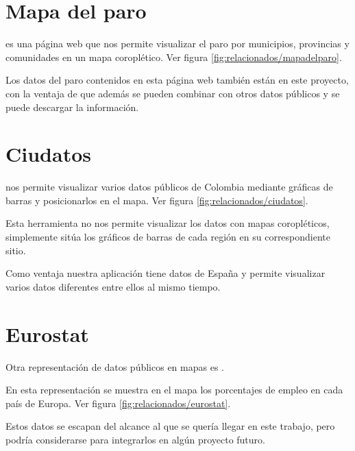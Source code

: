 

\section{Mapa del paro}

 es una página web que nos permite visualizar el paro por municipios, provincias y comunidades en un mapa coroplético. Ver figura \ref{fig:relacionados/mapadelparo}.

Los datos del paro contenidos en esta página web también están en este proyecto, con la ventaja de que además se pueden combinar con otros datos públicos y se puede descargar la información.


\section{Ciudatos}

 nos permite visualizar varios datos públicos de Colombia mediante gráficas de barras y posicionarlos en el mapa. Ver figura \ref{fig:relacionados/ciudatos}.

Esta herramienta no nos permite visualizar los datos con mapas coropléticos, simplemente sitúa los gráficos de barras de cada región en su correspondiente sitio.

Como ventaja nuestra aplicación tiene datos de España y permite visualizar varios datos diferentes entre ellos al mismo tiempo.


\section{Eurostat}

Otra representación de datos públicos en mapas es .

En esta representación se muestra en el mapa los porcentajes de empleo en cada país de Europa. Ver figura \ref{fig:relacionados/eurostat}.

Estos datos se escapan del alcance al que se quería llegar en este trabajo, pero podría considerarse para integrarlos en algún proyecto futuro.

